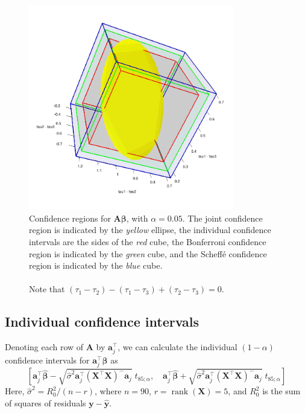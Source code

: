 \documentclass[10pt]{article}
\renewcommand{\vec}{\bm}
\DeclareMathOperator{\rank}{rank}
\begin{document}
    \begin{figure}[H]
    \begin{center}
        \includegraphics[width=0.8\textwidth]{confidence.png}
    \end{center}
    \caption{
        Confidence regions for $\vec{A}\vec{\beta}$, with $\alpha = 0.05$. The joint
        confidence region is indicated by the \emph{yellow} ellipse, the individual
        confidence intervals are the sides of the \emph{red} cube, the Bonferroni
        confidence region is indicated by the \emph{green} cube, and the Scheff\'e
        confidence region is indicated by the \emph{blue} cube. \\\\
        Note that $(\tau_1 - \tau_2) - (\tau_1 - \tau_3) + (\tau_2 - \tau_3) = 0$.
    }
    \label{fig:confidence}
    \end{figure}


    \subsection{Individual confidence intervals}

    Denoting each row of $\vec{A}$ by $\vec{a}_j^\top$, we can calculate the
    individual $(1 - \alpha)$ confidence intervals for $\vec{a}_j^\top\vec{\beta}$ as
    \[
        \left[
        \vec{a}_j^\top\hat{\vec{\beta}} - \sqrt{\hat{\sigma}^2
        \vec{a}_j^\top(\vec{X}^\top \vec{X})^-\vec{a}_j}\; t_{85; \alpha}, \quad
        \vec{a}_j^\top\hat{\vec{\beta}} + \sqrt{\hat{\sigma}^2
        \vec{a}_j^\top(\vec{X}^\top \vec{X})^-\vec{a}_j}\; t_{85; \alpha}
        \right]
    \] Here, $\hat{\sigma}^2 = R_0^2 / (n - r)$, where $n = 90$, $r = \rank(\vec{X})
    = 5$, and $R_0^2$ is the sum of squares of residuals $\vec{y} - \hat{\vec{y}}$.
\end{document}
